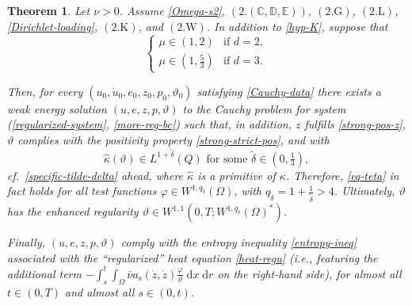 \documentclass[a4paper,10pt,reqno]{amsart}
\numberwithin{equation}{section}
\numberwithin{equation}{section}
\newtheorem{theorem}{Theorem}[section]
\def\dd{\;\!\mathrm{d}} %
\newcommand{\teta}{\vartheta}
\newcommand{\bbC}{\mathbb{C}}
\newcommand{\bbD}{\mathbb{D}}
\newcommand{\bbE}{\mathbb{E}}
\newcommand{\condu}{\kappa}
\newcommand{\ass}{a_{\mathrm{s}}}
\newcommand{\EEE}{\color{black}}
\begin{document}
\begin{theorem}
\label{mainth:2}
Let $\nu>0$.
Assume
\eqref{Omega-s2},  $(2.(\bbC,\bbD,\bbE))$,   $(2.\mathrm{G})$,  $(2.\mathrm{L})$,  %
 \eqref{Dirichlet-loading},   $(2.\mathrm{K})$,  and $(2.\mathrm{W})$.   In addition to \eqref{hyp-K}, suppose that 
\begin{equation}
\label{hyp-K-stronger}
\tag{2.$\condu_2$}
\begin{cases}
\mu \in (1,2) & \text{if } d=2,
\\
\mu \in \left(1, \frac53\right) & \text{if } d=3.
\end{cases}
\end{equation}
\par
Then, for every $(u_0, \dot{u}_0, e_0,z_0, p_0,\teta_0) $ satisfying \eqref{Cauchy-data} there exists a \emph{weak energy}  solution $(u,e,z,p,\teta)$ 
to the Cauchy problem for system 
(\ref{regularized-system}, \ref{more-reg-bc}) such that, in addition, $z$ fulfills \eqref{strong-pos-z},  $\teta$ complies with the positivity property 
\eqref{strong-strict-pos},
and with 
 \begin{equation}
 \label{further-k-teta}
 \hat{\condu}(\teta)  \in L^{1+\tilde{\delta}}(Q)  \text{ for some $\tilde\delta \in \left( 0, \tfrac13\right)$},
 \end{equation}  
 cf.\ \eqref{specific-tilde-delta} ahead,  where $\hat{\condu}$ is  a primitive of $\condu$.
 Therefore,
  \eqref{eq-teta} in fact holds for all test functions $\varphi \in W^{1,q_{\tilde \delta}}(\Omega)$, with $q_{\tilde \delta}= 1+\tfrac 1{\tilde \delta} > 4$. Ultimately, $\teta $ 
  has the enhanced regularity $\teta \in W^{1,1}(0,T;   W^{1,q_{\tilde \delta}}(\Omega)^*)$. 
  \par
  Finally,   $(u,e,z,p,\teta)$  comply with the 
  entropy inequality  \eqref{entropy-ineq} associated with the ``regularized'' heat equation \eqref{heat-regu} (i.e., featuring the additional term
  $-\int_s^t \int_\Omega \bar\nu \ass(\dot{z},\dot{z}) \frac{\varphi}\teta \dd x \dd r $ on the right-hand side),
  for almost all $t\in (0,T)$ and almost all $s\in (0,t)$.
 \end{theorem}
\end{document}
